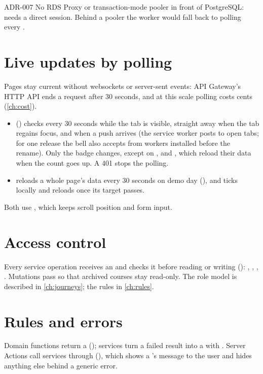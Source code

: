 \begin{decision}{ADR-007}
  No RDS Proxy or transaction-mode pooler in front of PostgreSQL:  needs a direct
  session. Behind a pooler the worker would fall back to polling every .
\end{decision}

\section{Live updates by polling}\label{sec:live-polling}
Pages stay current without websockets or server-sent events: API Gateway's HTTP API ends a
request after 30 seconds, and at this scale polling costs cents (\cref{ch:cost}).
\begin{itemize}
  \item {} () checks
     every 30 seconds while the tab is visible, straight away
    when the tab regains focus, and when a push arrives (the service worker posts
     to open tabs; for one release the bell also accepts  from workers installed before the rename). Only the badge changes, except on ,
     and , which reload their data when the count goes up.
    A 401 stops the polling.
  \item {} reloads a whole page's data every 30 seconds on demo day
    (), and  ticks locally and reloads once its target passes.
\end{itemize}
Both use , which keeps scroll position and form input.

\section{Access control}
Every service operation receives an  and checks it before reading or writing
(): , ,
, . Mutations pass  so that
archived courses stay read-only. The role model is described in \cref{ch:journeys}; the rules in
\cref{ch:rules}.

\section{Rules and errors}
Domain functions return a  (); services turn a failed
result into a  with . Server Actions call services through
 (), which shows a 's message to the
user and hides anything else behind a generic error.

